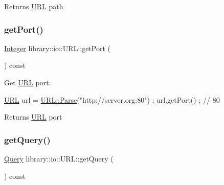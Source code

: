 \begin{DoxyReturn}{Returns}
\hyperlink{classlibrary_1_1io_1_1_u_r_l}{U\+RL} path 
\end{DoxyReturn}
\mbox{\label{classlibrary_1_1io_1_1_u_r_l_aa74b35304944c4686800eef65e464afd}} 
\subsubsection{\texorpdfstring{get\+Port()}{getPort()}}
{\footnotesize\ttfamily \hyperlink{namespacelibrary_1_1io_a0a929bf9e177597c2e92073d200dda53}{Integer} library\+::io\+::\+U\+R\+L\+::get\+Port (\begin{DoxyParamCaption}{ }\end{DoxyParamCaption}) const}



Get \hyperlink{classlibrary_1_1io_1_1_u_r_l}{U\+RL} port. 


\begin{DoxyCode}
\hyperlink{classlibrary_1_1io_1_1_u_r_l_a7e9c070138a6dbd000ffb10b7cd8a5c4}{URL} url = \hyperlink{classlibrary_1_1io_1_1_u_r_l_a98cf42141cf75e1dd5362eb208a1e2bd}{URL::Parse}(\textcolor{stringliteral}{"http://server.org:80"}) ;
url.getPort() ; \textcolor{comment}{// 80}
\end{DoxyCode}


\begin{DoxyReturn}{Returns}
\hyperlink{classlibrary_1_1io_1_1_u_r_l}{U\+RL} port 
\end{DoxyReturn}
\mbox{\label{classlibrary_1_1io_1_1_u_r_l_a9e2dfc922d148118443d8247679a28c1}} 
\subsubsection{\texorpdfstring{get\+Query()}{getQuery()}}
{\footnotesize\ttfamily \hyperlink{namespacelibrary_1_1io_a39ebaf2265de78ba79eb5347f2af61b3}{Query} library\+::io\+::\+U\+R\+L\+::get\+Query (\begin{DoxyParamCaption}{ }\end{DoxyParamCaption}) const}



